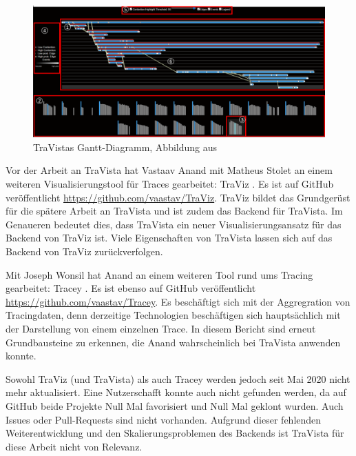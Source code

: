 \begin{figure}[H]
	\centering
	\includegraphics[width=0.815\linewidth]{img/03_methoden/travista_extended-gantt.png}
	\caption{TraVistas Gantt-Diagramm, Abbildung aus \cite{TraVistaPaper}}
	\label{fig:travista_extended-gantt}
\end{figure}

Vor der Arbeit an TraVista hat Vastaav Anand mit Matheus Stolet an einem weiteren Visualisierungstool für Traces gearbeitet: TraViz \cite{TraVizPaper}. Es ist auf GitHub veröffentlicht \url{https://github.com/vaastav/TraViz}. TraViz bildet das Grundgerüst für die spätere Arbeit an TraVista und ist zudem das Backend für TraVista. Im Genaueren bedeutet dies, dass TraVista ein neuer Visualisierungsansatz für das Backend von TraViz ist. Viele Eigenschaften von TraVista lassen sich auf das Backend von TraViz zurückverfolgen.

Mit Joseph Wonsil hat Anand an einem weiteren Tool rund ums Tracing gearbeitet: Tracey \cite{TraceyPaper}. Es ist ebenso auf GitHub veröffentlicht \url{https://github.com/vaastav/Tracey}. Es beschäftigt sich mit der Aggregration von Tracingdaten, denn derzeitige Technologien beschäftigen sich hauptsächlich mit der Darstellung von einem einzelnen Trace. In diesem Bericht sind erneut Grundbausteine zu erkennen, die Anand wahrscheinlich bei TraVista anwenden konnte.

Sowohl TraViz (und TraVista) als auch Tracey werden jedoch seit Mai 2020 nicht mehr aktualisiert. Eine Nutzerschafft konnte auch nicht gefunden werden, da auf GitHub beide Projekte Null Mal favorisiert und Null Mal geklont wurden. Auch Issues oder Pull-Requests sind nicht vorhanden. Aufgrund dieser fehlenden Weiterentwicklung und den Skalierungsproblemen des Backends ist TraVista für diese Arbeit nicht von Relevanz. %

